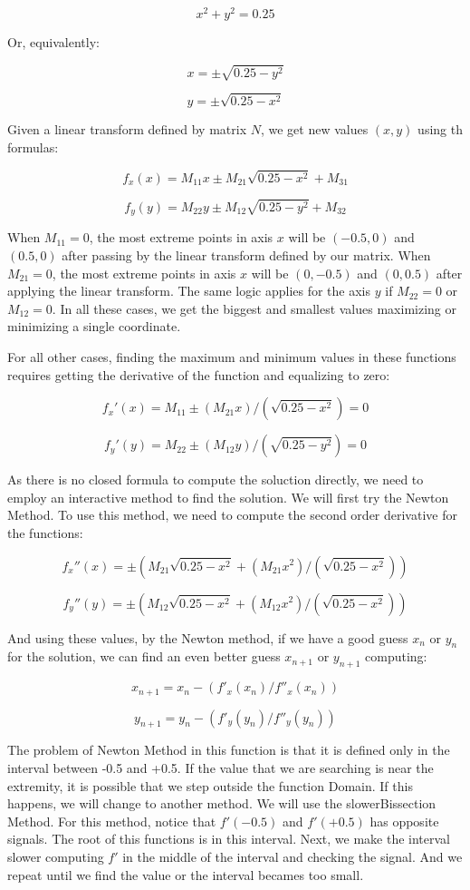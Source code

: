 {{{{{$$
x^2+y^2= 0.25
$$

Or, equivalently:

$$
x=\pm\sqrt{0.25-y^2}
$$

$$
y=\pm\sqrt{0.25-x^2}
$$

Given a linear transform defined by matrix $N$, we get new values
$(x,y)$ using th formulas:

$$
f_x(x) = M_{11}x \pm M_{21}\sqrt{0.25-x^2} + M_{31}
$$

$$
f_y(y) = M_{22}y \pm M_{12}\sqrt{0.25-y^2} + M_{32}
$$

When $M_{11}=0$, the most extreme points in axis $x$ will be $(-0.5,
0)$ and $(0.5, 0)$ after passing by the linear transform defined by
our matrix. When $M_{21}=0$, the most extreme points in axis $x$ will
be $(0, -0.5)$ and $(0, 0.5)$ after applying the linear transform. The
same logic applies for the axis $y$ if $M_{22}=0$ or $M_{12}=0$. In
all these cases, we get the biggest and smallest values maximizing or
minimizing a single coordinate.

For all other cases, finding the maximum and minimum values in these
functions requires getting the derivative of the function and
equalizing to zero:

$$
f_x'(x)=M_{11} \pm (M_{21}x)/(\sqrt{0.25-x^2})=0
$$

$$
f_y'(y)=M_{22} \pm (M_{12}y)/(\sqrt{0.25-y^2})=0
$$

As there is no closed formula to compute the soluction directly, we
need to employ an interactive method to find the solution. We will
first try the Newton Method. To use this method, we need to compute
the second order derivative for the functions:

$$
f_x''(x)= \pm (M_{21}\sqrt{0.25-x^2}+(M_{21}x^2)/(\sqrt{0.25-x^2}))
$$

$$
f_y''(y)= \pm (M_{12}\sqrt{0.25-x^2}+(M_{12}x^2)/(\sqrt{0.25-x^2}))
$$

And using these values, by the Newton method, if we have a good guess
$x_n$ or $y_n$ for the solution, we can find an even better guess
$x_{n+1}$ or $y_{n+1}$ computing:

$$
x_{n+1} = x_{n} - (f'_x(x_n)/f''_x(x_n))
$$

$$
y_{n+1} = y_{n} - (f'_y(y_n)/f''_y(y_n))
$$

The problem of Newton Method in this function is that it is defined
only in the interval between -0.5 and +0.5. If the value that we are
searching is near the extremity, it is possible that we step outside
the function Domain. If this happens, we will change to another
method. We will use the slowerBissection Method. For this method,
notice that $f'(-0.5)$ and $f'(+0.5)$ has opposite signals. The root
of this functions is in this interval. Next, we make the interval
slower computing $f'$ in the middle of the interval and checking the
signal. And we repeat until we find the value or the interval becames
too small.

}}}}}
